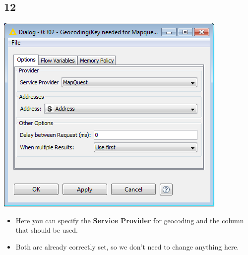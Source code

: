 \documentclass{beamer}
\begin{document}
\subsection{12}
\begin{frame}
	\begin{center}
  		\includegraphics[height=0.6\textheight]{12.png}
	\end{center}
	\begin{itemize}
		\item Here you can specify the \textbf{Service Provider} for geocoding and the column that should be used.
		\item Both are already correctly set, so we don't need to change anything here.
	\end{itemize}
\end{frame}
\end{document}
